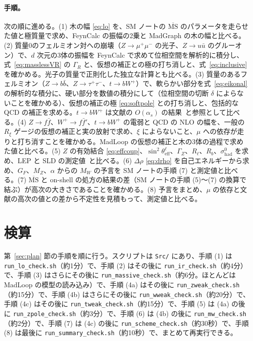 \documentclass[a4paper,10pt]{ltjsarticle}
\newcommand{\MSbar}{\overline{\mathrm{MS}}}
\begin{document}
\paragraph{手順。}次の順に進める。(1) 木の幅 \eqref{eq:lo} を、SM ノートの $\MSbar$ のパラメータを走らせた値と極質量で求め、FeynCalc の振幅の2乗と MadGraph の木の幅と比べる。(2) 質量0のフェルミオン対への崩壊（$Z\to\mu^+\mu^-$ の光子、$Z\to u\bar u$ のグルーオン）で、$d$ 次元の3体の振幅を FeynCalc で求めて位相空間を解析的に積分し、式~\eqref{eq:masslessVR} の $\Gamma_R$ と、仮想の補正との極の打ち消しと、式~\eqref{eq:inclusive} を確かめる。光子の質量で正則化した独立な計算とも比べる。(3) 質量のあるフェルミオン（$Z\to b\bar b$、$Z\to\tau^+\tau^-$、$t\to bW^+$）で、軟らかい部分を式~\eqref{eq:eikonal} の解析的な積分に、硬い部分を数値の積分にして（位相空間の切断 $\delta$ によらないことを確かめる）、仮想の補正の極 \eqref{eq:softpole} との打ち消しと、包括的な QCD の補正を求める。$t\to bW^+$ は文献の $O(\alpha_s)$ の結果~\cite{jk89}と参照として比べる。(4) $Z\to f\bar f$、$W^+\to f\bar f'$、$t\to bW^+$ の電弱と QCD の NLO の幅を、一般の $R_\xi$ ゲージの仮想の補正と実の放射で求め、$\xi$ によらないこと、$\mu$ への依存が走りと打ち消すことを確かめる。MadLoop の仮想の補正と木の3体の過程で求めた値と比べる。(5) $Z$ の有効結合 \eqref{eq:effcoup}、$\sin^2\theta^\ell_{\mathrm{eff}}$、$\Gamma_Z$、$R_\ell$、$R_b$、$\sigma^0_{\mathrm{had}}$ を求め、LEP と SLD の測定値~\cite{lepewwg06,pdg24}と比べる。(6) $\Delta\rho$ \eqref{eq:drho} を自己エネルギーから求め、$G_F$、$M_Z$、$\alpha$ からの $M_W$ の予言を SM ノートの手順 (7) と測定値と比べる。(7) $\MSbar$ と on-shell の処方の結果の差（SM ノートの手順 (5)〜(7) の換算で結ぶ）が高次の大きさであることを確かめる。(8) 予言をまとめ、$\mu$ の依存と文献の高次の値との差から不定性を見積もって、測定値と比べる。

\section{検算}\label{sec:checks}

第~\ref{sec:plan} 節の手順を順に行う。スクリプトは \texttt{Src/} にあり、手順 (1) は \texttt{run\_lo\_check.sh}（約1分）で、手順 (2) はその後に \texttt{run\_ir\_check.sh}（約4分）で、手順 (3) はさらにその後に \texttt{run\_massive\_check.sh}（約6分。ほとんどは MadLoop の模型の読み込み）で、手順 (4a) はその後に \texttt{run\_zweak\_check.sh}（約15分）で、手順 (4b) はさらにその後に \texttt{run\_wweak\_check.sh}（約20分）で、手順 (4c) はその後に \texttt{run\_tweak\_check.sh}（約15分）で、手順 (5) は (4a) の後に \texttt{run\_zpole\_check.sh}（約3分）で、手順 (6) は (4b) の後に \texttt{run\_mw\_check.sh}（約2分）で、手順 (7) は (4c) の後に \texttt{run\_scheme\_check.sh}（約30秒）で、手順 (8) は最後に \texttt{run\_summary\_check.sh}（約10秒）で、まとめて再実行できる。
\end{document}

